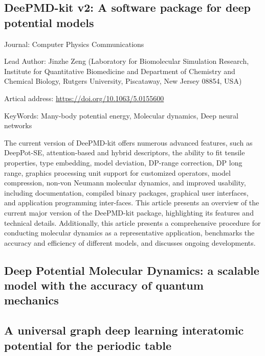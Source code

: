 \documentclass[11pt]{elegantbook}
\begin{document}
\subsection{DeePMD-kit v2: A software package for deep potential models}
\begin{brief}
    \item Journal: Computer Physics Communications
    \item Lead Author: Jinzhe Zeng (Laboratory for Biomolecular Simulation Research, Institute for Quantitative Biomedicine and Department of Chemistry
    and Chemical Biology, Rutgers University, Piscataway, New Jersey 08854, USA)
    \item Artical address: \href{https://doi.org/10.1063/5.0155600}{https://doi.org/10.1063/5.0155600}
    \item KeyWords: Many-body potential energy, Molecular dynamics, Deep neural networks
\end{brief}
The current version of DeePMD-kit offers numerous advanced features, such as DeepPot-SE, attention-based and hybrid descriptors, the ability to fit tensile properties, type embedding, model deviation, DP-range correction, DP long range, graphics processing unit support for customized operators, model compression, non-von Neumann molecular dynamics, and improved usability, including documentation, compiled binary packages, graphical user interfaces, and application programming inter-faces. This article presents an overview of the current major version of the DeePMD-kit package, highlighting its features and technical details. Additionally, this article presents a comprehensive procedure for conducting molecular dynamics as a representative application, benchmarks the accuracy and efficiency of different models, and discusses ongoing developments.









\subsection{Deep Potential Molecular Dynamics: a scalable model with the accuracy of quantum mechanics}


\subsection{A universal graph deep learning interatomic potential for the periodic table}



\end{document}
